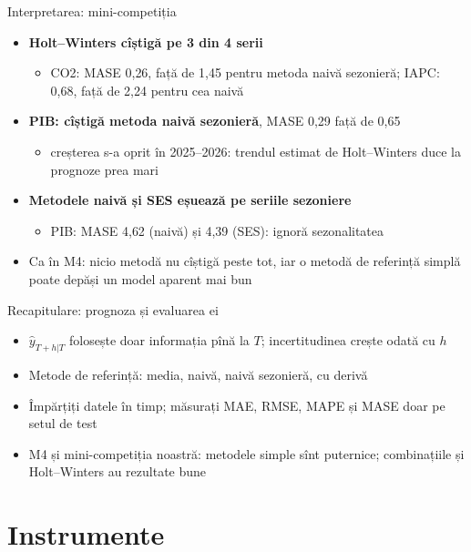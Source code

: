 \begin{frame}{Interpretarea: mini-competiția}
\itemsize{\small}
\begin{itemize}
    \item \textbf{Holt--Winters cîștigă pe 3 din 4 serii}
    \begin{itemize}
        \item CO2: MASE 0{,}26, față de 1{,}45 pentru metoda naivă sezonieră; IAPC: 0{,}68, față de 2{,}24 pentru cea naivă
    \end{itemize}
    \item \textbf{PIB: cîștigă metoda naivă sezonieră}, MASE 0{,}29 față de 0{,}65
    \begin{itemize}
        \item creșterea s-a oprit în 2025--2026: trendul estimat de Holt--Winters duce la prognoze prea mari
    \end{itemize}
    \item \textbf{Metodele naivă și SES eșuează pe seriile sezoniere}
    \begin{itemize}
        \item PIB: MASE 4{,}62 (naivă) și 4{,}39 (SES): ignoră sezonalitatea
    \end{itemize}
    \item Ca în M4: nicio metodă nu cîștigă peste tot, iar o metodă de referință simplă poate depăși un model aparent mai bun
\end{itemize}
\end{frame}

\begin{frame}{Recapitulare: prognoza și evaluarea ei}
\itemsize{\small}
\begin{itemize}
    \item $\hat y_{T+h|T}$ folosește doar informația pînă la $T$; incertitudinea crește odată cu $h$
    \item Metode de referință: media, naivă, naivă sezonieră, cu derivă
    \item Împărțiți datele în timp; măsurați MAE, RMSE, MAPE și MASE doar pe setul de test
    \item M4 și mini-competiția noastră: metodele simple sînt puternice; combinațiile și Holt--Winters au rezultate bune
\end{itemize}
\end{frame}


\section{Instrumente}

